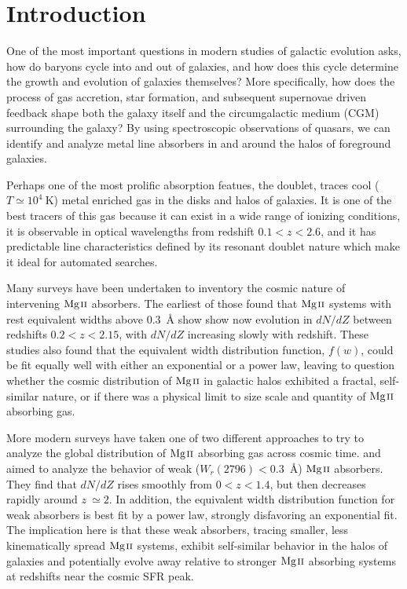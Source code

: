 \documentclass[iop,apj,numberedappendix,appendixfloats,twocolappendix]{emulateapj}
\begin{document}

\section{Introduction}
\label{sec:intro}

One of the most important questions in modern studies of galactic evolution asks, how do baryons cycle into and out of galaxies, and how does this cycle determine the growth and evolution of galaxies themselves? More specifically, how does the process of gas accretion, star formation, and subsequent supernovae driven feedback shape both the galaxy itself and the circumgalactic medium (CGM) surrounding the galaxy? By using spectroscopic observations of quasars, we can identify and analyze metal line absorbers in and around the halos of foreground galaxies. 

Perhaps one of the most prolific absorption featues, the {\MgIIdblt} doublet, traces cool ($T \simeq 10^4~\mathrm{K}$) metal enriched gas in the disks and halos of galaxies. It is one of the best tracers of this gas because it can exist in a wide range of ionizing conditions, it is observable in optical wavelengths from redshift $0.1 < z < 2.6$, and it has predictable line characteristics defined by its resonant doublet nature which make it ideal for automated searches. 

Many surveys have been undertaken to inventory the cosmic nature of intervening ${\hbox{{\rm Mg}\kern 0.1em{\sc ii}}}$ absorbers. The earliest of those \citep{Lanzetta1987,Tytler1987,Sargent1988,Steidel1992} found that ${\hbox{{\rm Mg}\kern 0.1em{\sc ii}}}$ systems with rest equivalent widths above $0.3$~{\AA} show show now evolution in $dN\!/dZ$ between redshifts $0.2 < z < 2.15$, with $dN\!/dZ$ increasing slowly with redshift. These studies also found that the equivalent width distribution function, $f(w)$, could be fit equally well with either an exponential or a power law, leaving to question whether the cosmic distribution of ${\hbox{{\rm Mg}\kern 0.1em{\sc ii}}}$ in galactic halos exhibited a fractal, self-similar nature, or if there was a physical limit to size scale and quantity of ${\hbox{{\rm Mg}\kern 0.1em{\sc ii}}}$ absorbing gas. 

More modern surveys have taken one of two different approaches to try to analyze the global distribution of ${\hbox{{\rm Mg}\kern 0.1em{\sc ii}}}$ absorbing gas across cosmic time. \cite{Churchill1999} and \cite{Narayanan2007} aimed to analyze the behavior of weak ($W_r(2796) < 0.3$~{\AA}) ${\hbox{{\rm Mg}\kern 0.1em{\sc ii}}}$ absorbers. They find that $dN\!/dZ$ rises smoothly from $0 < z < 1.4$, but then decreases rapidly around $z~\simeq 2$. In addition, the equivalent width distribution function for weak absorbers is best fit by a power law, strongly disfavoring an exponential fit. The implication here is that these weak absorbers, tracing smaller, less kinematically spread ${\hbox{{\rm Mg}\kern 0.1em{\sc ii}}}$ systems, exhibit self-similar behavior in the halos of galaxies and potentially evolve away relative to stronger ${\hbox{{\rm Mg}\kern 0.1em{\sc ii}}}$ absorbing systems at redshifts near the cosmic SFR peak. 
\end{document}
